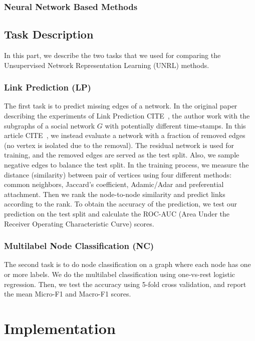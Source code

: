 \documentclass[a4paper]{article}
\newcommand{\citehere}{\textcolor[rgb]{1,0,0}{CITE\ }}
\begin{document}
\subsubsection{Neural Network Based Methods} %


\subsection{Task Description}

\noindent In this part, we describe the two tasks that we used for comparing the Unsupervised Network Representation Learning (UNRL) methods.

\subsubsection{Link Prediction (LP)}

\noindent The first task is to predict missing edges of a network. In the original paper describing the experiments of Link Prediction \citehere, the author work with the subgraphs of a social network $G$ with potentially different time-stamps. In this article \citehere, we instead evaluate a network with a fraction of removed edges (no vertex is isolated due to the removal). The residual network is used for training, and the removed edges are served as the test split. Also, we sample negative edges to balance the test split. In the training process, we measure the distance (similarity) between pair of vertices using four different methods: common neighbors, Jaccard's coefficient, Adamic/Adar and preferential attachment. Then we rank the node-to-node similarity and predict links according to the rank. To obtain the accuracy of the prediction, we test our prediction on the test split and calculate the ROC-AUC (Area Under the Receiver Operating Characteristic Curve) scores.

\subsubsection{Multilabel Node Classification (NC)}

\noindent The second task is to do node classification on a graph where each node has one or more labels. We do the multilabel classification using one-vs-rest logistic regression. Then, we test the accuracy using 5-fold cross validation, and report the mean Micro-F1 and Macro-F1 scores.


\section{Implementation}
\end{document}
